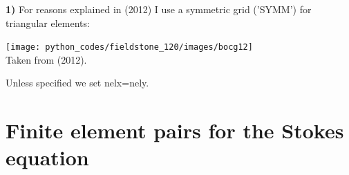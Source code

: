 \begin{remark}
{\bf 1)} For reasons explained in \textcite{bocg12} (2012) I use 
a symmetric grid ('SYMM') for triangular elements:
\begin{center} 
\texttt{[image: python\_codes/fieldstone\_120/images/bocg12]}\\
{\captionfont Taken from \textcite{bocg12} (2012).}
\end{center} 
\end{remark}

\begin{remark}
Unless specified we set nelx=nely.
\end{remark}

\section*{Finite element pairs for the Stokes equation}


